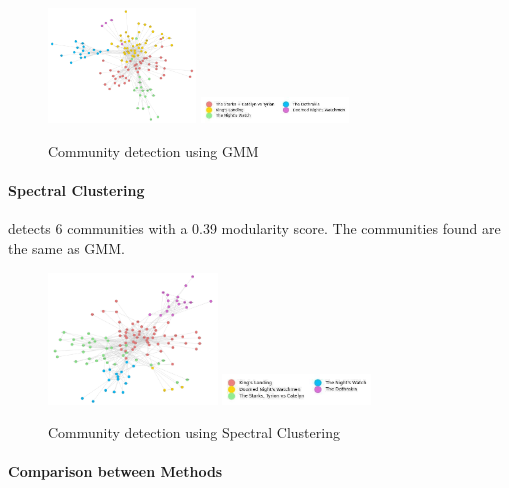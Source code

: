 \documentclass[10pt,twocolumn,letterpaper]{article}
\begin{document}
\begin{figure}[!h]
    \centering
    \includegraphics[width=0.35\textwidth]{img/s1/communities_gmm.jpg}
    \includegraphics[width=0.35\textwidth]{img/s1/gmm_legend.jpg} \\
    \vspace{0.2cm}
    \label{fig:gmm_s1}
    \caption{\small{Community detection using GMM}}
\end{figure}


\paragraph{Spectral Clustering} detects 6 communities with a 0.39 modularity score. The communities found are the same as GMM.

\vspace{2cm}

\begin{figure}[!h]
    \centering
    \includegraphics[width=0.4\textwidth]{img/s1/communities_sc.jpg}
    \includegraphics[width=0.35\textwidth]{img/s1/sc_legend.jpg} \\
    \vspace{0.2cm}
    \label{fig:sc_s1}
    \caption{\small{Community detection using Spectral Clustering}}
\end{figure}


\paragraph{Comparison between Methods}
\end{document}
